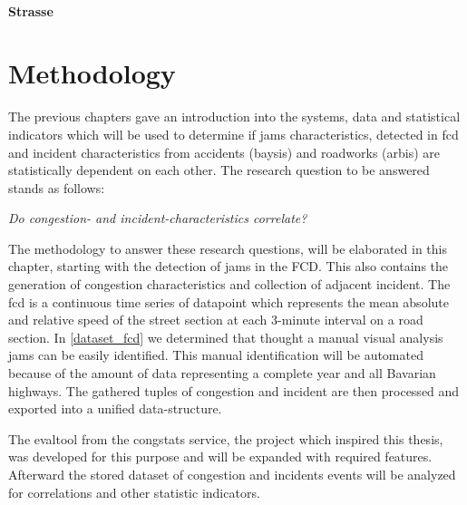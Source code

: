 \documentclass[a4paper,12pt]{report}
\begin{document}

\subsubsection{Strasse}



%

\chapter{Methodology}
\label{methodology}
The previous chapters gave an introduction into the systems, data and statistical indicators which will be used to determine if jams characteristics, detected in \acrshort{fcd} and incident characteristics from accidents (\acrshort{baysis}) and roadworks (\acrshort{arbis}) are statistically dependent on each other. The research question to be answered stands as follows:

\begin{center}
	\textit{Do congestion- and incident-characteristics correlate?}
\end{center}

\medskip

The methodology to answer these research questions, will be elaborated in this chapter, starting with the detection of jams in the FCD. This also contains the generation of congestion characteristics and collection of adjacent incident. The \acrshort{fcd} is a continuous time series of datapoint which represents the mean absolute and relative speed of the street section at each 3-minute interval on a road section. In \ref{dataset_fcd} we determined that thought a manual visual analysis jams can be easily identified. This manual identification will be automated because of the amount of data representing a complete year and all Bavarian highways. The gathered tuples of congestion and incident are then processed and exported into a unified data-structure. 

The \gls{evaltool} from the \gls{congstats} service, the project which inspired this thesis, was developed for this purpose and will be expanded with required features. Afterward the stored dataset of congestion and incidents events will be analyzed for correlations and other statistic indicators.
\end{document}
